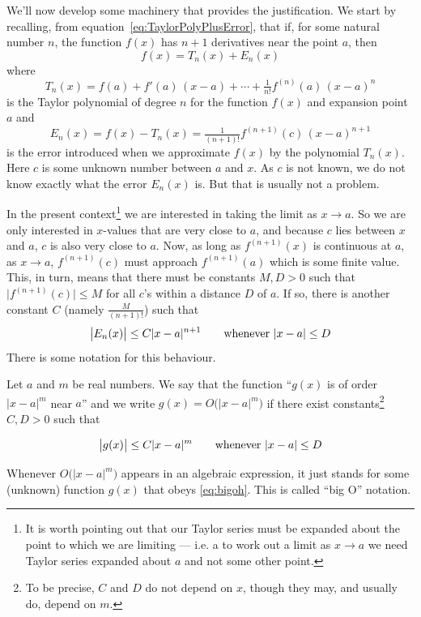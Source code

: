 We'll now develop some machinery that provides the
justification.
We start by recalling, from equation~\eqref{eq:TaylorPolyPlusError},
that if, for some natural number $n$, the function $f(x)$ has
$n+1$ derivatives near the point $a$, then
\begin{equation*}
f(x)
=T_n(x) +E_n(x)
\end{equation*}
where
\begin{equation*}
T_n(x)=f(a)+f'(a)\,(x-a)+\cdots+\tfrac{1}{n!}f^{(n)}(a)\, (x-a)^n
\end{equation*}
is the Taylor polynomial of degree $n$ for the function $f(x)$ and expansion
point $a$ and
\begin{equation*}
E_n(x)=f(x)-T_n(x)=\tfrac{1}{(n+1)!}f^{(n+1)}(c)\, (x-a)^{n+1}
\end{equation*}
is the error introduced when we approximate $f(x)$ by the polynomial $T_n(x)$.
Here $c$ is some unknown number between $a$ and $x$. As $c$ is not known,
we do not know exactly what the error $E_n(x)$ is. But that is usually not a problem.

In the present context\footnote{It is worth pointing out that
our Taylor series must be expanded about the point to
which we are limiting --- i.e. a to work out a limit as
$x\to a$ we need Taylor series expanded about $a$ and not
some other point.} we are interested in taking the limit as
$x \to a$.  So we are only interested in $x$-values that are
very close to $a$, and because $c$ lies between $x$ and $a$,
$c$ is also very close to $a$. Now, as long as
$f^{(n+1)}(x)$ is continuous at $a$, as $x \to a$,
$f^{(n+1)}(c)$ must approach $f^{(n+1)}(a)$ which is
some finite value. This, in turn,  means that there must be
constants $M,D>0$ such that $\big|f^{(n+1)}(c)\big|\le M$
for all $c$'s within a distance $D$ of $a$. If so, there is
another constant $C$ (namely $\tfrac{M}{(n+1)!}$) such that
\begin{equation*}
\big|E_n(x)\big|\le C |x-a|^{n+1}\qquad\hbox{whenever }|x-a|\le D
\end{equation*}
There is some notation for this behaviour.

\begin{defn}\label{def:bigoh}
Let $a$ and $m$ be real numbers. We say that the function
``$g(x)$ is of order $|x-a|^m$ near $a$'' and we write
$g(x)=O\big(|x-a|^m\big)$ if there exist constants\footnote{To be precise,
$C$ and $D$ do not depend on $x$, though they may, and usually do,
depend on $m$.}
$C,D>0$ such that
\begin{impeqn}\label{eq:bigoh}
\begin{equation*}
\big|g(x)\big|\le C |x-a|^m\qquad\hbox{whenever }|x-a|\le D
\end{equation*}
\end{impeqn}
Whenever $O\big(|x-a|^m\big)$ appears in an algebraic expression,
it just stands for some (unknown) function $g(x)$ that obeys \eqref{eq:bigoh}.
This is called ``big O'' notation.
\end{defn}

